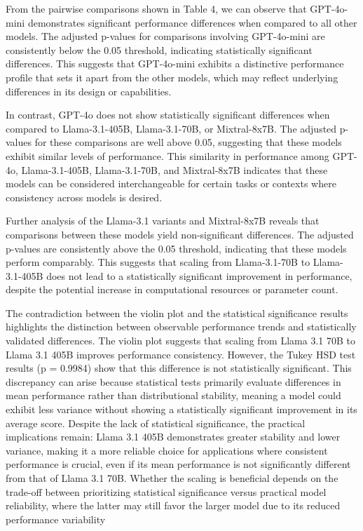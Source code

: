 From the pairwise comparisons shown in Table 4, we can observe that GPT-4o-mini demonstrates significant performance differences when compared to all other models. The adjusted p-values for comparisons involving GPT-4o-mini are consistently below the 0.05 threshold, indicating statistically significant differences. This suggests that GPT-4o-mini exhibits a distinctive performance profile that sets it apart from the other models, which may reflect underlying differences in its design or capabilities.

In contrast, GPT-4o does not show statistically significant differences when compared to Llama-3.1-405B, Llama-3.1-70B, or Mixtral-8x7B. The adjusted p-values for these comparisons are well above 0.05, suggesting that these models exhibit similar levels of performance. This similarity in performance among GPT-4o, Llama-3.1-405B, Llama-3.1-70B, and Mixtral-8x7B indicates that these models can be considered interchangeable for certain tasks or contexts where consistency across models is desired.

Further analysis of the Llama-3.1 variants and Mixtral-8x7B reveals that comparisons between these models yield non-significant differences. The adjusted p-values are consistently above the 0.05 threshold, indicating that these models perform comparably. This suggests that scaling from Llama-3.1-70B to Llama-3.1-405B does not lead to a statistically significant improvement in performance, despite the potential increase in computational resources or parameter count.

The contradiction between the violin plot and the statistical significance results highlights the distinction between observable performance trends and statistically validated differences. The violin plot suggests that scaling from Llama 3.1 70B to Llama 3.1 405B improves performance consistency. However, the Tukey HSD test results (p = 0.9984) show that this difference is not statistically significant. This discrepancy can arise because statistical tests primarily evaluate differences in mean performance rather than distributional stability, meaning a model could exhibit less variance without showing a statistically significant improvement in its average score. Despite the lack of statistical significance, the practical implications remain: Llama 3.1 405B demonstrates greater stability and lower variance, making it a more reliable choice for applications where consistent performance is crucial, even if its mean performance is not significantly different from that of Llama 3.1 70B. Whether the scaling is beneficial depends on the trade-off between prioritizing statistical significance versus practical model reliability, where the latter may still favor the larger model due to its reduced performance variability

